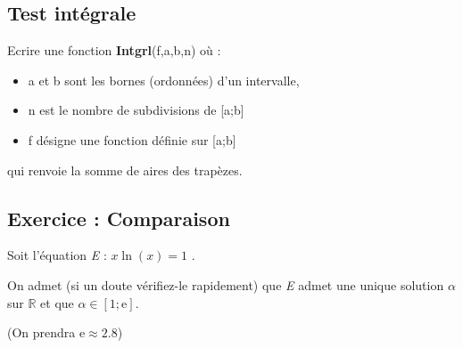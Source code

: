 \documentclass[11pt,a4paper]{article}
\renewcommand{\:}{\textbackslash}
\begin{document}
\subsection*{Test intégrale}

Ecrire une fonction \textbf{Intgrl}(f,a,b,n) où :
\begin{itemize}
\item a et b sont les bornes (ordonnées) d'un intervalle,
\item n est le nombre de subdivisions de [a;b]
\item f désigne une fonction définie sur [a;b]
\end{itemize}
qui renvoie la somme de aires des trapèzes.



\subsection*{Exercice : Comparaison}


Soit l'équation \emph{E} : \quad $x\ln(x)=1$ .

\medskip

On admet (si un doute vérifiez-le rapidement) que \emph{E} admet une unique solution $\alpha$ sur $\mathbb R$ et que
$\alpha\in[1;\text{e}]$.

(On prendra e$\approx2.8$)

\medskip
\end{document}
